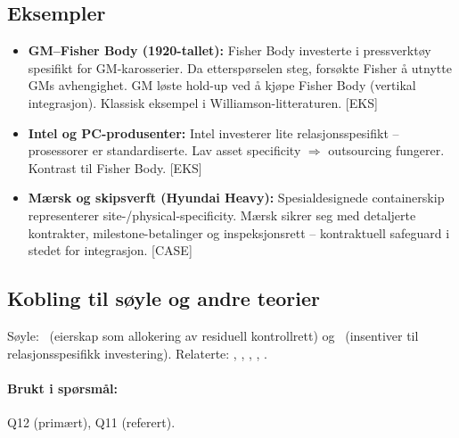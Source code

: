 \subsection*{Eksempler}
\begin{itemize}\setlength{\itemsep}{2pt}
\item \textbf{GM--Fisher Body (1920-tallet):} Fisher Body investerte i pressverktøy spesifikt for GM-karosserier. Da etterspørselen steg, forsøkte Fisher å utnytte GMs avhengighet. GM løste hold-up ved å kjøpe Fisher Body (vertikal integrasjon). Klassisk eksempel i Williamson-litteraturen. [EKS]
\item \textbf{Intel og PC-produsenter:} Intel investerer lite relasjons\-spesifikt -- prosessorer er standardiserte. Lav asset specificity $\Rightarrow$ outsourcing fungerer. Kontrast til Fisher Body. [EKS]
\item \textbf{Mærsk og skipsverft (Hyundai Heavy):} Spesialdesignede containerskip representerer site-/physical-specificity. Mærsk sikrer seg med detaljerte kontrakter, milestone-betalinger og inspeksjonsrett -- kontraktuell safeguard i stedet for integrasjon. [CASE]
\end{itemize}

\subsection*{Kobling til søyle og andre teorier}
Søyle: \SOne\ (eierskap som allokering av residuell kontrollrett) og \SThree\ (insentiver til relasjonsspesifikk investering). Relaterte: , , , , .

\paragraph{Brukt i spørsmål:} Q12 (primært), Q11 (referert).
